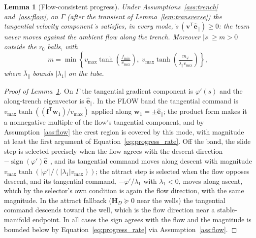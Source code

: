 \documentclass[12pt, letterpaper, oneside]{report}
\newtheorem{lemma}[theorem]{Lemma}
\begin{document}
\begin{lemma}[Flow-consistent progress]
\label{lem:progress}
Under Assumptions~\ref{ass:trench} and~\ref{ass:flow}, on $\Gamma$ (after
the transient of Lemma~\ref{lem:transverse}) the tangential velocity
component $\dot s$ satisfies, in every mode,
$\dot s\,(\mathbf{v}^{\mathsf T}\hat{\mathbf{e}}_\parallel)\geq0$: the
team never moves against the ambient flow along the trench. Moreover
$|\dot s|\geq m>0$ outside the $r_0$ balls, with
\begin{equation}
m = \min\left\{v_{\max}\tanh\!\left(\tfrac{f_{\min}}{v_{\max}}\right),\; v_{\max}\tanh\!\left(\tfrac{m_\varphi}{\bar\lambda_\parallel v_{\max}}\right)\right\},
\label{eq:progress_rate}
\end{equation}
where $\bar\lambda_\parallel$ bounds $|\lambda_1|$ on the tube.
\end{lemma}

\begin{proof}[Proof of Lemma~\ref{lem:progress}]
On $\Gamma$ the tangential gradient component is $\varphi'(s)$ and the
along-trench eigenvector is $\hat{\mathbf{e}}_\parallel$. In the FLOW
band the tangential command is
$v_{\max}\tanh((\mathbf{f}^{\mathsf T}\mathbf{w}_1)/v_{\max})$ applied
along $\mathbf{w}_1=\pm\hat{\mathbf{e}}_\parallel$; the product form
makes it a nonnegative multiple of the flow's tangential component, and
by Assumption~\ref{ass:flow} the crest region is covered by this mode,
with magnitude at least the first argument of
Equation~\eqref{eq:progress_rate}. Off the band, the slide step is
selected precisely when the flow agrees with the descent direction
$-\operatorname{sign}(\varphi')\hat{\mathbf{e}}_\parallel$, and its
tangential command moves along descent with magnitude
$v_{\max}\tanh(|\varphi'|/(|\lambda_1|v_{\max}))$; the attract step is
selected when the flow opposes descent, and its tangential command,
$-\varphi'/\lambda_1$ with $\lambda_1<0$, moves along ascent, which by
the selector's own condition is again the flow direction, with the same
magnitude. In the attract fallback ($\mathbf{H}_D\succeq0$ near the
wells) the tangential command descends toward the well, which is the
flow direction near a stable-manifold endpoint. In all cases the sign
agrees with the flow and the magnitude is bounded below by
Equation~\eqref{eq:progress_rate} via Assumption~\ref{ass:flow}.
\end{proof}
\end{document}
